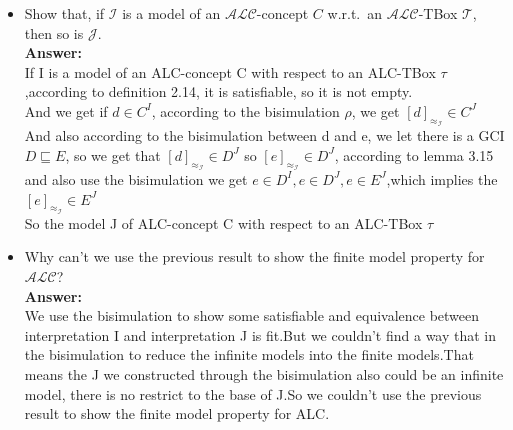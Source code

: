 \documentclass{article}
\begin{document}
\begin{itemize}
        \item Show that, if $\mathcal{I}$ is a model of an $\mathcal{ALC}$-concept $C$ w.r.t.\ an $\mathcal{ALC}$-TBox $\mathcal{T}$, then so is $\mathcal{J}$.\\
        \textbf{Answer:}\\
        If I is a model of an ALC-concept C with respect to an ALC-TBox $\tau$,according to definition 2.14, it is satisfiable, so it is not empty.\\
        And we get if $d \in C^I$, according to the bisimulation $\rho$, we get $[d]_{\approx_{\mathcal{I}}} \in C^J$\\
        And also according to the bisimulation between d and e, we let there is a GCI $D \sqsubseteq E$, so we get that $[d]_{\approx_{\mathcal{I}}} \in D^J$ so $[e]_{\approx_{\mathcal{I}}}\in D^J$, according to lemma 3.15 and also use the bisimulation
        we get $e \in D^I,e\in D^J,e\in E^J$,which implies the $[e]_{\approx_{\mathcal{I}}} \in E^J$\\
        So the model J of ALC-concept C with respect to an ALC-TBox $\tau$

        \item Why can't we use the previous result to show the finite model property for $\mathcal{ALC}$?\\
        \textbf{Answer:}\\
        We use the bisimulation to show some satisfiable and equivalence between interpretation I and interpretation J is fit.But we couldn't find a way
        that in the bisimulation to reduce the infinite models into the finite models.That means the J we constructed through the bisimulation also could be
        an infinite model, there is no restrict to the base of J.So we couldn't use the previous result to show the finite model property for ALC.\\

    \end{itemize}
\end{document}
